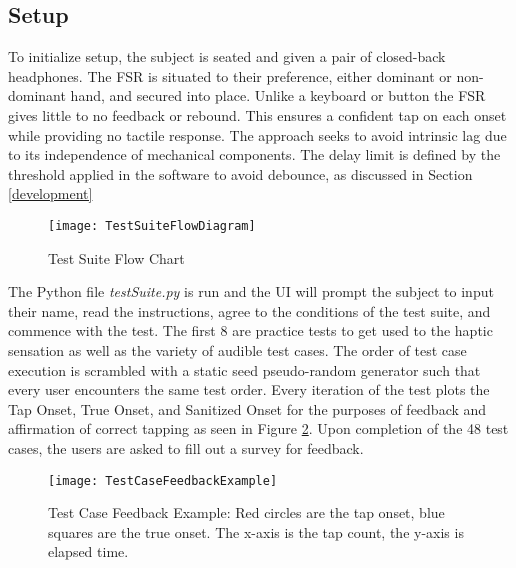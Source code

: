 \subsection{Setup} \label{testSetup}
To initialize setup, the subject is seated and given a pair of closed-back headphones. The FSR is situated to their preference, either dominant or non-dominant hand, and secured into place. Unlike a keyboard or button the FSR gives little to no feedback or rebound. This ensures a confident tap on each onset while providing no tactile response. The approach seeks to avoid intrinsic lag due to its independence of mechanical components. The delay limit is defined by the threshold applied in the software to avoid debounce, as discussed in Section \ref{development}

\begin{figure}[H]
    \centering
    \texttt{[image: TestSuiteFlowDiagram]}
    \caption{Test Suite Flow Chart}
    \label{fig:TestSuiteFlowDiagram}
\end{figure}

The Python file \textit{testSuite.py} is run and the UI will prompt the subject to input their name, read the instructions, agree to the conditions of the test suite, and commence with the test. The first 8 are practice tests to get used to the haptic sensation as well as the variety of audible test cases. The order of test case execution is scrambled with a static seed pseudo-random generator such that every user encounters the same test order. Every iteration of the test plots the Tap Onset, True Onset, and Sanitized Onset  for the purposes of feedback and affirmation of correct tapping as seen in Figure \ref{fig:TestCaseFeedbackEx}. Upon completion of the 48 test cases, the users are asked to fill out a survey for feedback.

\begin{figure}[]
    \centering
    \texttt{[image: TestCaseFeedbackExample]}
    \caption{Test Case Feedback Example: Red circles are the tap onset, blue squares are the true onset. The x-axis is the tap count, the y-axis is elapsed time.}
    \label{fig:TestCaseFeedbackEx}
\end{figure}

